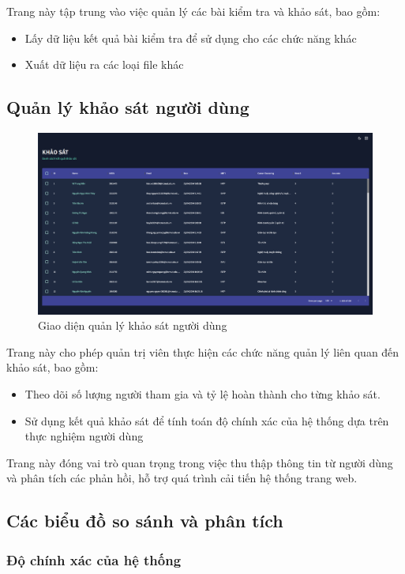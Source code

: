 Trang này tập trung vào việc quản lý các bài kiểm tra và khảo sát, bao gồm:
\begin{itemize}
    \item Lấy dữ liệu kết quả bài kiểm tra để sử dụng cho các chức năng khác 
    \item Xuất dữ liệu ra các loại file khác
\end{itemize}

\subsection{Quản lý khảo sát người dùng}
\label{sec:survey_management}
\begin{figure}[H]
    \centering
    \includegraphics[width=0.75\linewidth]{images/surAdmin.png}
    \vspace{0.6cm}
    \caption{Giao diện quản lý khảo sát người dùng}
\end{figure}

Trang này cho phép quản trị viên thực hiện các chức năng quản lý liên quan đến khảo sát, bao gồm:
\begin{itemize}
    \item Theo dõi số lượng người tham gia và tỷ lệ hoàn thành cho từng khảo sát.
    \item Sử dụng kết quả khảo sát để tính toán độ chính xác của hệ thống dựa trên thực nghiệm người dùng
\end{itemize}

Trang này đóng vai trò quan trọng trong việc thu thập thông tin từ người dùng và phân tích các phản hồi, hỗ trợ quá trình cải tiến hệ thống trang web.

\subsection{Các biểu đồ so sánh và phân tích}
\label{sec:charts}
\subsubsection{Độ chính xác của hệ thống}

